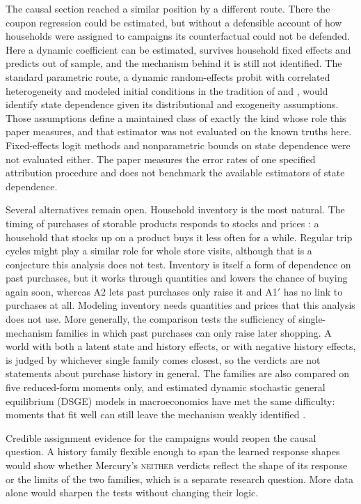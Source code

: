 \documentclass[11pt]{article}
\newcommand{\verdict}[1]{\textsc{#1}}
\begin{document}
The causal section reached a similar position by a different route. There the coupon
regression could be estimated, but without a defensible account of how households were
assigned to campaigns its counterfactual could not be defended. Here a dynamic
coefficient can be estimated, survives household fixed effects and predicts out of sample, and
the mechanism behind it is still not identified. The standard parametric route, a dynamic
random-effects probit with correlated heterogeneity and modeled initial conditions in the
tradition of \citet{heckman1981} and \citet{hyslop1999}, would identify state dependence given
its distributional and exogeneity assumptions. Those assumptions define a maintained class of
exactly the kind whose role this paper measures, and that estimator was not evaluated on the known truths here.
Fixed-effects logit methods \citep{honore_weidner2025} and nonparametric bounds on state
dependence \citep{torgovitsky2019} were not evaluated either. The paper measures the error
rates of one specified attribution procedure and does not benchmark the available estimators of
state dependence.

Several alternatives remain open. Household inventory is the most natural. The timing of
purchases of storable products responds to stocks and prices
\citep{hendel_nevo2006}: a household that stocks up on a product buys it less often
for a while. Regular trip cycles might play a similar role for whole store visits, although
that is a conjecture this analysis does not test. Inventory is itself a form of dependence on
past purchases, but it works through quantities and lowers the chance of buying again soon,
whereas A2 lets past purchases only raise it and A1$'$ has no link to purchases at all.
Modeling inventory needs quantities and prices that this analysis does not use. More
generally, the comparison tests the sufficiency of single-mechanism families in which past
purchases can only raise later shopping. A world with both a latent state and history effects,
or with negative history effects, is judged by whichever single family comes closest, so the
verdicts are not statements about purchase history in general. The families are also compared
on five reduced-form moments only, and estimated dynamic stochastic general equilibrium (DSGE) models in macroeconomics
have met the same difficulty: moments that fit well can still leave the mechanism weakly
identified \citep{canova_sala}.

Credible assignment evidence for the campaigns would reopen the causal question. A history
family flexible enough to span the learned response shapes would show whether Mercury's
\verdict{neither} verdicts reflect the shape of its response or the limits of the two
families, which is a separate research question. More data alone would sharpen the tests without
changing their logic.
\end{document}
